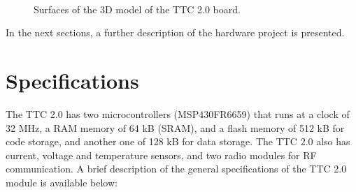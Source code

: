 \begin{figure}[!htb]
    \begin{center}
        ~
        \caption{Surfaces of the 3D model of the TTC 2.0 board.}
        \label{fig:ttc2-3d-surface}
    \end{center}
\end{figure}

In the next sections, a further description of the hardware project is presented.

\section{Specifications}

The TTC 2.0 has two microcontrollers (MSP430FR6659) that runs at a clock of 32 MHz, a RAM memory of 64 kB (SRAM), and a flash memory of 512 kB for code storage, and another one of 128 kB for data storage. The TTC 2.0 also has current, voltage and temperature sensors, and two radio modules for RF communication. A brief description of the general specifications of the TTC 2.0 module is available below:

